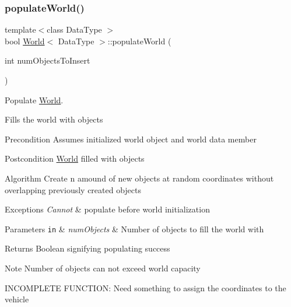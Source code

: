 \subsubsection{\texorpdfstring{populate\+World()}{populateWorld()}}
{\footnotesize\ttfamily template$<$class Data\+Type $>$ \\
bool \hyperlink{class_world}{World}$<$ Data\+Type $>$\+::populate\+World (\begin{DoxyParamCaption}\item[{int}]{num\+Objects\+To\+Insert }\end{DoxyParamCaption})}



Populate \hyperlink{class_world}{World}. 

Fills the world with objects

\begin{DoxyPrecond}{Precondition}
Assumes initialized world object and world data member
\end{DoxyPrecond}
\begin{DoxyPostcond}{Postcondition}
\hyperlink{class_world}{World} filled with objects
\end{DoxyPostcond}
\begin{DoxyParagraph}{Algorithm}
Create n amound of new objects at random coordinates without overlapping previously created objects
\end{DoxyParagraph}

\begin{DoxyExceptions}{Exceptions}
{\em Cannot} & populate before world initialization\\
\hline
\end{DoxyExceptions}

\begin{DoxyParams}[1]{Parameters}
\mbox{\tt in}  & {\em num\+Objects} & Number of objects to fill the world with\\
\hline
\end{DoxyParams}
\begin{DoxyReturn}{Returns}
Boolean signifying populating success
\end{DoxyReturn}
\begin{DoxyNote}{Note}
Number of objects can not exceed world capacity

I\+N\+C\+O\+M\+P\+L\+E\+TE F\+U\+N\+C\+T\+I\+ON\+: Need something to assign the coordinates to the vehicle 
\end{DoxyNote}
\hypertarget{class_world_a1772d55d0ac866cf725d75a8bcd83dd7}{}\label{class_world_a1772d55d0ac866cf725d75a8bcd83dd7} 

